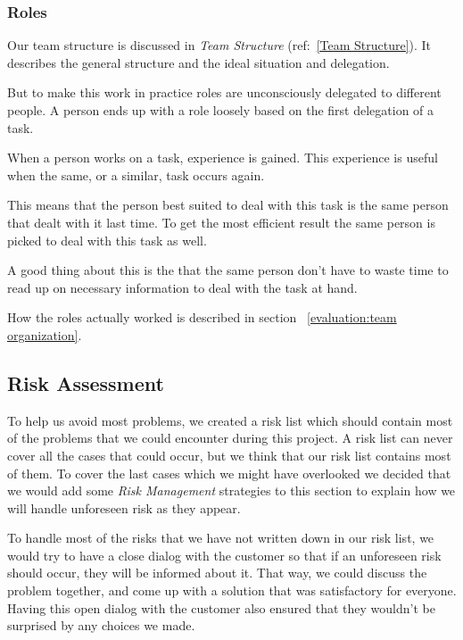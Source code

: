     \subsubsection{Roles}\label{roles}
    
    Our team structure is discussed in \textit{Team Structure} (ref:~\ref{Team Structure}). It describes the general structure and the ideal situation and delegation. 
    
    But to make this work in practice roles are unconsciously delegated to different people. A person ends up with a role loosely based on the first delegation of a task. 
    
    When a person works on a task, experience is gained. This experience is useful when the same, or a similar, task occurs again. 
    
    This means that the person best suited to deal with this task is the same person that dealt with it last time. To get the most efficient result the same person is picked to deal with this task as well. 

    A good thing about this is the that the same person don't have to waste time to read up on necessary information to deal with the task at hand.  
    
    How the roles actually worked is described in section ~\ref{evaluation:team organization}.
        
    \subsection{Risk Assessment}\label{Risk Assessment}
     To help us avoid most problems, we created a risk list which should contain most of the problems that we could encounter during this project. A risk list can never cover all the cases that could occur, but we think that our risk list contains most of them. To cover the last cases which we might have overlooked we decided that we would add some \textit{Risk Management} strategies to this section to explain how we will handle unforeseen risk as they appear. 
     
     To handle most of the risks that we have not written down in our risk list, we would try to have a close dialog with the customer so that if an unforeseen risk should occur, they will be informed about it. That way, we could discuss the problem together, and come up with a solution that was satisfactory for everyone. Having this open dialog with the customer also ensured that they wouldn't be surprised by any choices we made.
     
